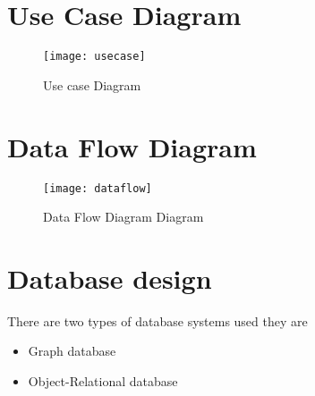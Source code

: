 \section{Use Case Diagram}
\begin{figure}[h]
	\texttt{[image: usecase]}
	\centering
	\caption{Use case Diagram}
\end{figure}
\newpage
\section{Data Flow Diagram}
\begin{figure}[h]
	\texttt{[image: dataflow]}
	\centering
	\caption{Data Flow Diagram Diagram}
\end{figure}
\newpage
\section{Database design}
\par There are two types of database systems used they are 
\begin{itemize}
\item Graph database 
\item Object-Relational database
\end{itemize}

